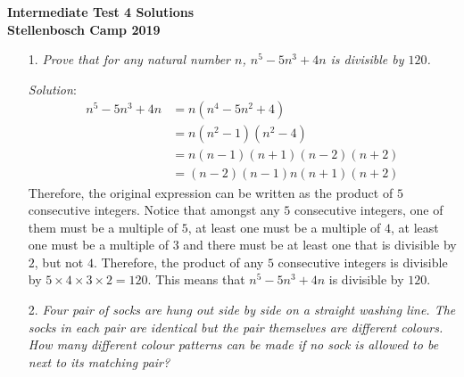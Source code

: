 \documentclass{article}
\begin{document}
\begin{center}
  \textbf{\Large Intermediate Test 4 Solutions}
 \\ \vspace{1em}
  \textbf{\large Stellenbosch Camp 2019}
\end{center}

\vspace{12pt}

\begin{enumerate}[1.]

\item[1.] %
\textit{Prove that for any natural number $n$, $n^5-5n^3+4n$ is divisible by $120$. }

\textit{Solution}:
\begin{align*}
  n^5 - 5n^3 + 4n & = n(n^4 - 5n^2 + 4) \\
  & = n(n^2 - 1)(n^2 - 4) \\
  & = n(n - 1)(n + 1)(n - 2)(n + 2) \\
  & = (n - 2)(n - 1)n(n + 1)(n + 2)
\end{align*}
Therefore, the original expression can be written as the product of $5$ consecutive integers.
Notice that amongst any $5$ consecutive integers, one of them must be a multiple of $5$, at least one must be a multiple of $4$, at least one must be a multiple of $3$ and there must be at least one that is divisible by $2$, but not $4$.
Therefore, the product of any $5$ consecutive integers is divisible by $5 \times 4 \times 3 \times 2 = 120$. This means that $n^5 - 5n^3 + 4n$ is divisible by $120$.


\item[2.] %
\textit{Four pair of socks are hung out side by side on a straight washing line.
The socks in each pair are identical but the pair themselves are different colours.
How many different colour patterns can be made if no sock is allowed to be next to its matching pair?
}


\end{enumerate}
\end{document}
